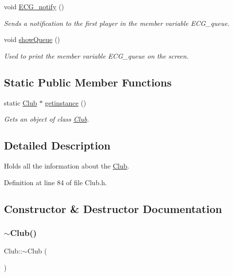 \begin{DoxyCompactItemize}
void \hyperlink{class_club_aad02197c0f3431dbe8c2e12033e24f63}{E\+C\+G\+\_\+notify} ()
\begin{DoxyCompactList}\small\item\em Sends a notification to the first player in the member variable E\+C\+G\+\_\+queue. \end{DoxyCompactList}\item 
void \hyperlink{class_club_a7ef23c55751610bc2cb98a356a6bee46}{show\+Queue} ()
\begin{DoxyCompactList}\small\item\em Used to print the member variable E\+C\+G\+\_\+queue on the screen. \end{DoxyCompactList}\end{DoxyCompactItemize}
\subsection*{Static Public Member Functions}
\begin{DoxyCompactItemize}
\item 
static \hyperlink{class_club}{Club} $\ast$ \hyperlink{class_club_aefc364f93d7b49202fe8fa35c01da4cf}{getinstance} ()
\begin{DoxyCompactList}\small\item\em Gets an object of class \hyperlink{class_club}{Club}. \end{DoxyCompactList}\end{DoxyCompactItemize}


\subsection{Detailed Description}
Holds all the information about the \hyperlink{class_club}{Club}. 

Definition at line 84 of file Club.\+h.



\subsection{Constructor \& Destructor Documentation}
\hypertarget{class_club_a1c2993e141cfa6468284274359cc7de5}{}\label{class_club_a1c2993e141cfa6468284274359cc7de5} 
\subsubsection{\texorpdfstring{$\sim$\+Club()}{~Club()}}
{\footnotesize\ttfamily Club\+::$\sim$\+Club (\begin{DoxyParamCaption}{ }\end{DoxyParamCaption})}



